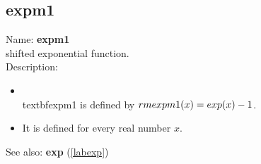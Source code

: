 \subsection{expm1}
\label{labexpm1}
\noindent Name: \textbf{expm1}\\
shifted exponential function.\\
\noindent Description: \begin{itemize}

\item \\textbf{expm1} is defined by ${\\rm expm1}(x) = \\exp(x)-1$.\n
\item It is defined for every real number $x$.\n\end{itemize}
See also: \textbf{exp} (\ref{labexp})
